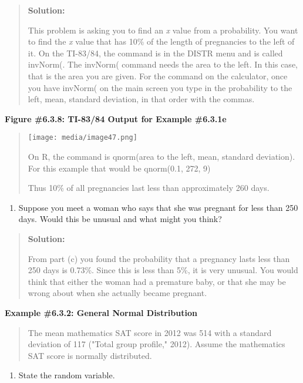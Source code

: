 \documentclass[]{book}
\providecommand{\tightlist}{%
  \setlength{\itemsep}{0pt}\setlength{\parskip}{0pt}}
\begin{document}
\begin{quote}
\textbf{Solution:}

This problem is asking you to find an \emph{x} value from a probability.
You want to find the \emph{x} value that has 10\% of the length of
pregnancies to the left of it. On the TI-83/84, the command is in the
DISTR menu and is called invNorm(. The invNorm( command needs the area
to the left. In this case, that is the area you are given. For the
command on the calculator, once you have invNorm( on the main screen
you type in the probability to the left, mean, standard deviation, in
that order with the commas.
\end{quote}

\textbf{Figure \#6.3.8: TI-83/84 Output for Example \#6.3.1e}

\begin{quote}
\texttt{[image: media/image47.png]}

On R, the command is qnorm(area to the left, mean, standard
deviation). For this example that would be qnorm(0.1, 272, 9)

Thus 10\% of all pregnancies last less than approximately 260 days.
\end{quote}

\begin{enumerate}
\def\labelenumi{\alph{enumi}.}
\setcounter{enumi}{5}
\tightlist
\item
  Suppose you meet a woman who says that she was pregnant for less
  than 250 days. Would this be unusual and what might you think?
\end{enumerate}

\begin{quote}
\textbf{Solution:}

From part (c) you found the probability that a pregnancy lasts less
than 250 days is 0.73\%. Since this is less than 5\%, it is very
unusual. You would think that either the woman had a premature baby,
or that she may be wrong about when she actually became pregnant.
\end{quote}

\textbf{Example \#6.3.2: General Normal Distribution}

\begin{quote}
The mean mathematics SAT score in 2012 was 514 with a standard
deviation of 117 ("Total group profile," 2012). Assume the
mathematics SAT score is normally distributed.
\end{quote}

\begin{enumerate}
\def\labelenumi{\alph{enumi}.}
\tightlist
\item
  State the random variable.
\end{enumerate}
\end{document}
